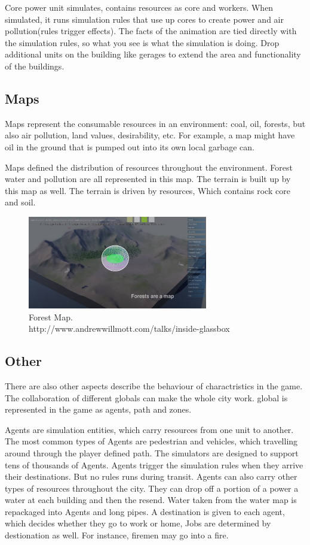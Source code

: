 Core power unit simulates, contains resources as core and workers. When simulated, it runs simulation rules that use up cores to create power and air pollution(rules trigger effects). The facts of the animation are tied directly with the simulation rules, so what you see is what the simulation is doing. Drop additional units on the building like gerages to extend the area and functionality of the buildings.

\subsection{Maps}

Maps represent the consumable resources in an environment: coal, oil, forests, but also air pollution, land values, desirability, etc. For example, a map might have oil in the ground that is pumped out into its own local garbage can.

Maps defined the distribution of resources throughout the environment. Forest water and pollution are all represented in this map. The terrain is built up by this map as well. The terrain is driven by resources, Which contains rock core and soil.

\begin{figure}[htb]
	\centering
	\includegraphics[width=0.7\textwidth]{gfx/Maps}  	  	 	
	\caption{Forest Map.\\ http://www.andrewwillmott.com/talks/inside-glassbox}
	\label{fig:example5_2}
\end{figure}

\subsection{Other}

There are also other aspects describe the behaviour of charactristics in the game. The collaboration of different globals can make the whole city work. global is represented in the game as agents, path and zones. 

Agents are simulation entities, which carry resources from one unit to another. The most common types of Agents are pedestrian and vehicles, which travelling around through the player defined path. The simulators are designed to support tens of thousands of Agents. Agents trigger the simulation rules when they arrive their destinations. But no rules runs during transit. Agents can also carry other types of resources throughout the city. They can drop off a portion of a power a water at each building and then the resend. Water taken from the water map is repackaged into Agents and long pipes. A destination is given to each agent, which decides whether they go to work or home, Jobs are determined by destionation as well. For instance, firemen may go into a fire.

